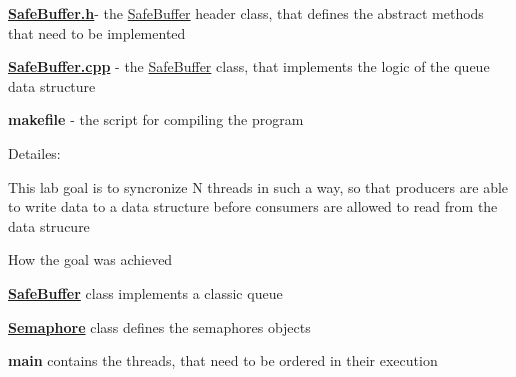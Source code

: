 \begin{DoxyEnumerate}
\begin{DoxyItemize}
\item {\bfseries \hyperlink{SafeBuffer_8h}{Safe\+Buffer.\+h}}-\/ the \hyperlink{classSafeBuffer}{Safe\+Buffer} header class, that defines the abstract methods that need to be implemented
\item {\bfseries \hyperlink{SafeBuffer_8cpp}{Safe\+Buffer.\+cpp} }-\/ the \hyperlink{classSafeBuffer}{Safe\+Buffer} class, that implements the logic of the queue data structure
\item {\bfseries makefile }-\/ the script for compiling the program
\end{DoxyItemize}
\item Detailes\+:
\begin{DoxyEnumerate}
\item This lab goal is to syncronize N threads in such a way, so that producers are able to write data to a data structure before consumers are allowed to read from the data strucure
\item How the goal was achieved
\begin{DoxyItemize}
\item {\bfseries \hyperlink{classSafeBuffer}{Safe\+Buffer}} class implements a classic queue
\item {\bfseries \hyperlink{classSemaphore}{Semaphore}} class defines the semaphores objects
\item {\bfseries main } contains the threads, that need to be ordered in their execution 
\end{DoxyItemize}
\end{DoxyEnumerate}
\end{DoxyEnumerate}
